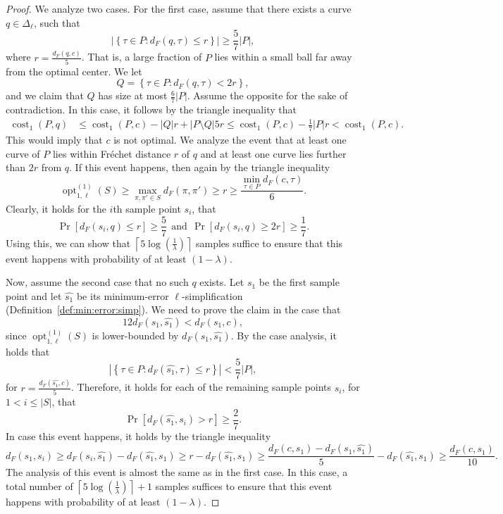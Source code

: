 \documentclass[11pt, letter]{article}
\DeclareMathOperator{\cost}{cost}
\DeclareMathOperator{\opt}{opt}
\newcommand{\defref}[1]{Definition~\ref{def:#1}}
\newcommand{\Frechet}{Fr\'echet\xspace}
\providecommand{\ceil}[1]{\left\lceil {#1} \right\rceil}
\providecommand{\pth}[2][\!]{#1\left({#2}\right)}
\providecommand{\brc}[1]{\left\{ {#1} \right\}}
\providecommand{\cardin}[1]{\left\lvert#1\right\rvert}
\newcommand{\pbrc}[1]{\left[ {#1} \right]}
\newcommand{\lenClusters}{\ensuremath{\ell}}
\newcommand{\distFr}[2]{\ensuremath{d_F\pth{#1,#2}}}
\begin{document}
\begin{proof}
We analyze two cases. For the first case, assume that there exists a curve $q\in
\Delta_{\lenClusters}$, such that 
\[ \cardin{\brc{\tau \in P: \distFr{q}{\tau} \leq r}} \geq \frac{5}{7} |P|, \] 
where $r=\frac{\distFr{q}{c}}{5}$.
That is, a large fraction of $P$  lies within a small ball far away from the
optimal center. We let
\[ Q= \brc{\tau \in P:  \distFr{q}{\tau} < 2r},\]
and we claim that $Q$ has size at most $\frac{6}{7}|P|$.
Assume the opposite for the sake of contradiction. In this case, it follows by the triangle inequality that
\begin{eqnarray*}
\cost_{1}(P,q) &\leq \cost_{1}(P,c) - |Q|r + |P\setminus Q| 5r \leq
\cost_{1}(P,c) - \frac{1}{7} |P| r < \cost_1(P,c).
\end{eqnarray*}
This would imply that $c$ is not optimal. 
We analyze the event that at least one curve of $P$ lies within
\Frechet distance $r$ of $q$ and at least one curve lies further than $2r$ from
$q$. If this event happens, then again by the triangle inequality 
\[ \opt^{(1)}_{1,\lenClusters}(S)\geq \max_{\pi,\pi' \in S} \distFr{\pi}{\pi'} \geq r \geq \frac{\min_{\tau \in
P}\distFr{c}{\tau}}{6}.\]
Clearly, it holds for the $i$th sample point $s_i$, that
\[ \Pr\pbrc{ \distFr{s_i}{q} \leq r } \geq \frac{5}{7}~~\text{and}~~ \Pr\pbrc{ \distFr{s_i}{q} \geq 2r } \geq \frac{1}{7}.\]
Using this, we can show that $\ceil{5 \log(\frac{1}{\lambda})}$ samples suffice to ensure that this
event happens with probability of at least $(1-\lambda)$.

Now, assume the second case that no such $q$ exists. Let $s_1$ be the first
sample point and let $\widehat{s_1}$ be its minimum-error $\ell$-simplification
(\defref{min:error:simp}). We need to prove the claim in the case that
\begin{equation}\label{assump1}
12 \distFr{s_1}{\widehat{s_1}} < \distFr{s_1}{c},  
\end{equation}
since $\opt^{(1)}_{1,\lenClusters}(S)$ is lower-bounded by
$\distFr{s_1}{\widehat{s_1}}$. 
By the case analysis, it holds that 
\[ \cardin{\brc{\tau \in P: \distFr{\widehat{s_1}}{\tau} \leq r}} < \frac{5}{7} |P|, \] 
for $r=\frac{\distFr{\widehat{s_1}}{c}}{5}$. Therefore, it holds for each of the remaining sample points $s_i$, for $1 < i
\leq |S|$, that
\begin{equation*}
\Pr\pbrc{ \distFr{\widehat{s_1}}{s_i} > r} \geq \frac{2}{7}.
\end{equation*}
In case this event happens, it holds by the triangle inequality
\begin{equation*}
\distFr{s_1}{s_i} 
\geq \distFr{s_i}{\widehat{s_1}}-\distFr{\widehat{s_1}}{s_1}
\geq r-\distFr{\widehat{s_1}}{s_1} 
\geq \frac{\distFr{c}{s_1}-\distFr{s_1}{\widehat{s_1}}}{5}-\distFr{\widehat{s_1}}{s_1}
\geq \frac{\distFr{c}{s_1}}{10}.
\end{equation*}
The analysis of this event is almost the same as in the first case. In this
case, a total number of $\ceil{5 \log(\frac{1}{\lambda})} + 1$ samples suffices to ensure that this
event happens with probability of at least $(1-\lambda)$.
\end{proof}
\end{document}
